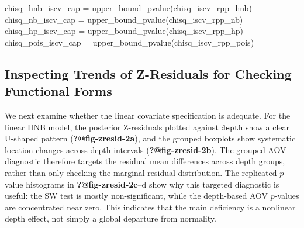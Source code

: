 \documentclass[
  english,
  letterpaper,
  DIV=11,
  numbers=noendperiod]{scrartcl}
\newenvironment{Shaded}{\begin{snugshade}}{\end{snugshade}}
\newcommand{\FunctionTok}[1]{\textcolor[rgb]{0.28,0.35,0.67}{#1}}
\newcommand{\NormalTok}[1]{\textcolor[rgb]{0.00,0.23,0.31}{#1}}
\newcommand{\OtherTok}[1]{\textcolor[rgb]{0.00,0.23,0.31}{#1}}
\begin{document}
\begin{Shaded}
\begin{Highlighting}[]
\NormalTok{chisq\_hnb\_iscv\_cap  }\OtherTok{=} \FunctionTok{upper\_bound\_pvalue}\NormalTok{(chisq\_iscv\_rpp\_hnb)}
\NormalTok{chisq\_nb\_iscv\_cap   }\OtherTok{=} \FunctionTok{upper\_bound\_pvalue}\NormalTok{(chisq\_iscv\_rpp\_nb)}
\NormalTok{chisq\_hp\_iscv\_cap   }\OtherTok{=} \FunctionTok{upper\_bound\_pvalue}\NormalTok{(chisq\_iscv\_rpp\_hp)}
\NormalTok{chisq\_pois\_iscv\_cap }\OtherTok{=} \FunctionTok{upper\_bound\_pvalue}\NormalTok{(chisq\_iscv\_rpp\_pois)}
\end{Highlighting}
\end{Shaded}

\subsection{Inspecting Trends of Z-Residuals for Checking Functional
Forms}\label{inspecting-trends-of-z-residuals-for-checking-functional-forms}

We next examine whether the linear covariate specification is adequate.
For the linear HNB model, the posterior Z-residuals plotted against
\(\texttt{depth}\) show a clear U-shaped pattern
(\textbf{?@fig-zresid-2a}), and the grouped boxplots show systematic
location changes across depth intervals (\textbf{?@fig-zresid-2b}). The
grouped AOV diagnostic therefore targets the residual mean differences
across depth groups, rather than only checking the marginal residual
distribution. The replicated \(p\)-value histograms in
\textbf{?@fig-zresid-2c}--d show why this targeted diagnostic is useful:
the SW test is mostly non-significant, while the depth-based AOV
\(p\)-values are concentrated near zero. This indicates that the main
deficiency is a nonlinear depth effect, not simply a global departure
from normality.
\end{document}
